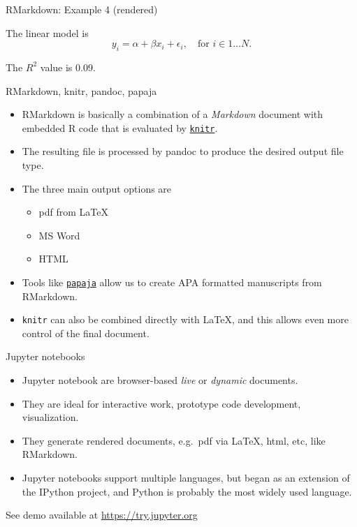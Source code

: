\documentclass[10pt,ignorenonframetext,]{beamer}
\providecommand{\tightlist}{%
  \setlength{\itemsep}{0pt}\setlength{\parskip}{0pt}}
\begin{document}
\begin{frame}{RMarkdown: Example 4 (rendered)}
\protect\hypertarget{rmarkdown-example-4-rendered-1}{}

The linear model is \[
y_i = \alpha + \beta x_i + \epsilon_i, 
\quad \text{for $i \in 1 \ldots N$}.
\]

The \(R^2\) value is 0.09.

\end{frame}

\begin{frame}[fragile]{RMarkdown, knitr, pandoc, papaja}
\protect\hypertarget{rmarkdown-knitr-pandoc-papaja}{}

\begin{itemize}
\item
  RMarkdown is basically a combination of a \emph{Markdown} document
  with embedded R code that is evaluated by
  \href{https://yihui.name/knitr/}{\texttt{knitr}}.
\item
  The resulting file is processed by pandoc to produce the desired
  output file type.
\item
  The three main output options are

  \begin{itemize}
  \tightlist
  \item
    pdf from \LaTeX
  \item
    MS Word
  \item
    HTML
  \end{itemize}
\item
  Tools like \href{https://github.com/crsh/papaja}{\texttt{papaja}}
  allow us to create APA formatted manuscripts from RMarkdown.
\item
  \texttt{knitr} can also be combined directly with \LaTeX, and this
  allows even more control of the final document.
\end{itemize}

\end{frame}

\begin{frame}{Jupyter notebooks}
\protect\hypertarget{jupyter-notebooks}{}

\begin{itemize}
\tightlist
\item
  Jupyter notebook are browser-based \emph{live} or \emph{dynamic}
  documents.
\item
  They are ideal for interactive work, prototype code development,
  visualization.
\item
  They generate rendered documents, e.g.~pdf via \LaTeX, html, etc, like
  RMarkdown.
\item
  Jupyter notebooks support multiple languages, but began as an
  extension of the IPython project, and Python is probably the most
  widely used language.
\end{itemize}

See demo available at \url{https://try.jupyter.org}

\end{frame}
\end{document}
